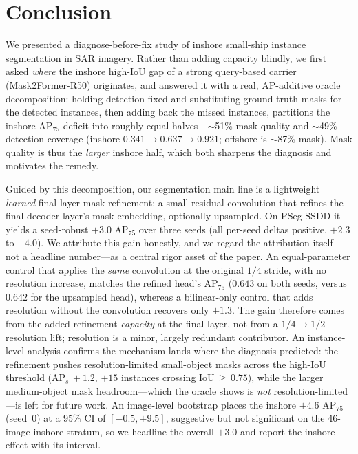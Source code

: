 \section{Conclusion}
\label{sec:conclusion}
We presented a diagnose-before-fix study of inshore small-ship instance segmentation in SAR imagery. Rather than adding capacity blindly, we first asked \emph{where} the inshore high-IoU gap of a strong query-based carrier (Mask2Former-R50) originates, and answered it with a real, AP-additive oracle decomposition: holding detection fixed and substituting ground-truth masks for the detected instances, then adding back the missed instances, partitions the inshore AP$_{75}$ deficit into roughly equal halves---$\sim$51\% mask quality and $\sim$49\% detection coverage (inshore $0.341\!\rightarrow\!0.637\!\rightarrow\!0.921$; offshore is $\sim$87\% mask). Mask quality is thus the \emph{larger} inshore half, which both sharpens the diagnosis and motivates the remedy.

Guided by this decomposition, our segmentation main line is a lightweight \emph{learned} final-layer mask refinement: a small residual convolution that refines the final decoder layer's mask embedding, optionally upsampled. On PSeg-SSDD it yields a seed-robust $+3.0$ AP$_{75}$ over three seeds (all per-seed deltas positive, $+2.3$ to $+4.0$). We attribute this gain honestly, and we regard the attribution itself---not a headline number---as a central rigor asset of the paper. An equal-parameter control that applies the \emph{same} convolution at the original $1/4$ stride, with no resolution increase, matches the refined head's AP$_{75}$ ($0.643$ on both seeds, versus $0.642$ for the upsampled head), whereas a bilinear-only control that adds resolution without the convolution recovers only $+1.3$. The gain therefore comes from the added refinement \emph{capacity} at the final layer, not from a $1/4\!\rightarrow\!1/2$ resolution lift; resolution is a minor, largely redundant contributor. An instance-level analysis confirms the mechanism lands where the diagnosis predicted: the refinement pushes resolution-limited small-object masks across the high-IoU threshold (AP$_{s}\,{+}1.2$, $+15$ instances crossing IoU$\,{\ge}\,0.75$), while the larger medium-object mask headroom---which the oracle shows is \emph{not} resolution-limited---is left for future work. An image-level bootstrap places the inshore $+4.6$ AP$_{75}$ (seed~0) at a $95\%$ CI of $[-0.5,+9.5]$, suggestive but not significant on the 46-image inshore stratum, so we headline the overall $+3.0$ and report the inshore effect with its interval.

